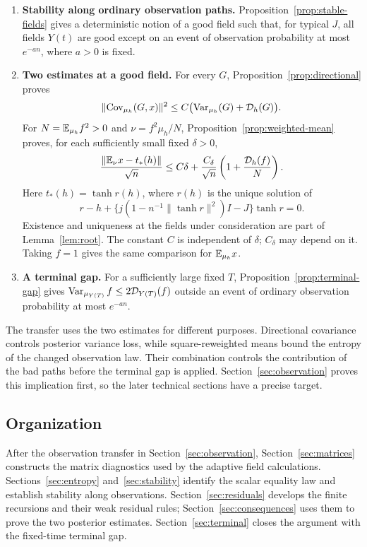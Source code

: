 \begin{enumerate}
\item \textbf{Stability along ordinary observation paths.}
Proposition~\ref{prop:stable-fields} gives a deterministic notion of a good
field such that, for typical $J$, all fields $Y(t)$ are good except on an event
of observation probability at most $e^{-a n}$, where $a>0$ is fixed.

\item \textbf{Two estimates at a good field.}
For every $G$, Proposition~\ref{prop:directional} proves
\begin{equation}\label{eq:input-directional}
 \lVert \operatorname{Cov}_{\mu_h}(G,x)\rVert^2
 \le C\bigl(\operatorname{Var}_{\mu_h}(G)+\mathcal D_h(G)\bigr).
\end{equation}
For $N=\mathbb E_{\mu_h}f^2>0$ and $\nu=f^2\mu_h/N$,
Proposition~\ref{prop:weighted-mean} proves, for each sufficiently small fixed $\delta>0$,
\begin{equation}\label{eq:input-weighted}
 \frac{\lVert \mathbb E_\nu x-t_*(h)\rVert}{\sqrt n}
 \le C\delta+\frac{C_\delta}{\sqrt n}
                 \left(1+\frac{\mathcal D_h(f)}{N}\right).
\end{equation}
Here $t_*(h)=\tanh r(h)$, where $r(h)$ is the unique solution of
\[
 r-h+\{j(1-n^{-1}\|\tanh r\|^2)I-J\}\tanh r=0.
\]
Existence and uniqueness at the fields under consideration are part of
Lemma~\ref{lem:root}. The constant $C$ is independent of $\delta$; $C_\delta$ may depend
on it. Taking $f=1$ gives the same comparison for $\mathbb E_{\mu_h}x$.

\item \textbf{A terminal gap.}
For a sufficiently large fixed $T$, Proposition~\ref{prop:terminal-gap}
gives $\operatorname{Var}_{\mu_{Y(T)}}f\le2\mathcal D_{Y(T)}(f)$ outside an event of ordinary
observation probability at most $e^{-a n}$.
\end{enumerate}

The transfer uses the two estimates for different purposes. Directional
covariance controls posterior variance loss, while square-reweighted means
bound the entropy of the changed observation law. Their combination controls
the contribution of the bad paths before the terminal gap is applied.
Section~\ref{sec:observation} proves this implication first, so the later
technical sections have a precise target.

\subsection{Organization}
After the observation transfer in Section~\ref{sec:observation},
Section~\ref{sec:matrices} constructs the matrix diagnostics used by the
adaptive field calculations. Sections~\ref{sec:entropy}
and~\ref{sec:stability} identify the scalar equality law and establish
stability along observations. Section~\ref{sec:residuals} develops the
finite recursions and their weak residual rules; Section~\ref{sec:consequences}
uses them to prove the two posterior estimates. Section~\ref{sec:terminal}
closes the argument with the fixed-time terminal gap.
